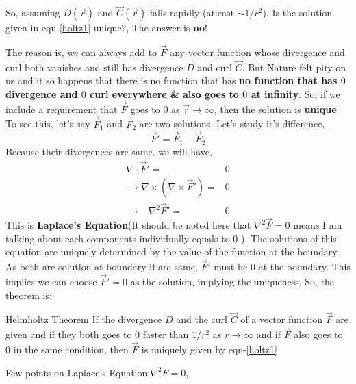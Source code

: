 \documentclass{article}
\begin{document}
So, assuming $D(\vec{r})$ and $\vec{C}(\vec{r})$ falls rapidly (atleast $\sim 1/r^2$), Is the solution given in eqn-\ref{holtz1} unique?, The answer is \textbf{no}!

The reason is, we can always add to $\vec{F}$ any vector function whose divergence and curl both vanishes and still has divergence $D$ and curl $\vec{C}$. But Nature felt pity on us and it so happens that there is no function that has \textbf{no function that has $0$ divergence and $0$ curl everywhere \& also goes to $0$ at infinity}. So, if we include a requirement that $\vec{F}$ goes to $0$ as $\vec{r}\to \infty$, then the solution is \textbf{unique}.\\
To see this, let's say $\vec{F}_1$ and $\vec{F}_2$ are two solutions. Let's study it's difference,
\begin{equation}
    \vec{F}' = \vec{F}_1 - \vec{F}_2
\end{equation}
Because their divergences are same, we will have,
\begin{equation}
    \begin{split}
        \nabla \cdot \vec{F}' =& 0\\
        \to \nabla\times(\nabla \times \vec{F}') =& 0\\
        \to -\nabla^2 \vec{F}' =& 0
    \end{split}
\end{equation}
This is \textbf{Laplace's Equation}(It should be noted here that $\nabla^2\vec{F}=0$ means I am talking about each components individually equals to $0$ ). The solutions of this equation are uniquely determined by the value of the function at the boundary. As both are solution at boundary if are same, $\vec{F}'$ must be $0$ at the boundary. This implies we can choose $\vec{F}'=0$ as the solution, implying the uniqueness.
So, the theorem is:
\begin{theorem}{Helmholtz Theorem}{}
    If the divergence $D$ and the curl $\vec{C}$ of a vector function $\vec{F}$ are given and if they both goes to $0$ faster than $1/r^2$ as $r\to\infty$ and if $\vec{F}$ also goes to $0$ in the same condition, then $\vec{F}$ is uniquely given by eqn-\ref{holtz1}
\end{theorem}
Few points on Laplace's Equation:$\nabla^2 F = 0$,
\end{document}
